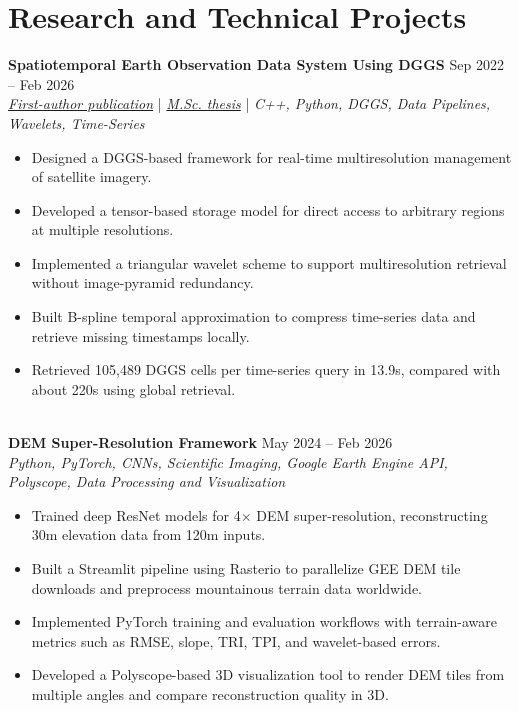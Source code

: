 \documentclass[a4paper,10pt]{article}
\begin{document}

\section*{Research and Technical Projects}

\noindent
\textbf{Spatiotemporal Earth Observation Data System Using DGGS} \hfill Sep 2022 -- Feb 2026 \\
\textit{\href{https://doi.org/10.3390/rs17040570}{First-author publication}} | \textit{\href{https://ucalgary.scholaris.ca/items/114b394b-e516-4732-bd3a-45dd6160d480}{M.Sc. thesis}} | \textit{C++, Python, DGGS, Data Pipelines, Wavelets, Time-Series}
\begin{itemize}[leftmargin=0.25in]
    \item Designed a DGGS-based framework for real-time multiresolution management of satellite imagery.
    \item Developed a tensor-based storage model for direct access to arbitrary regions at multiple resolutions.
    \item Implemented a triangular wavelet scheme to support multiresolution retrieval without image-pyramid redundancy.
    \item Built B-spline temporal approximation to compress time-series data and retrieve missing timestamps locally.
    \item Retrieved 105,489 DGGS cells per time-series query in 13.9s, compared with about 220s using global retrieval.
\end{itemize}

\noindent \\
\textbf{DEM Super-Resolution Framework} \hfill May 2024 -- Feb 2026 \\
\textit{Python, PyTorch, CNNs, Scientific Imaging, Google Earth Engine API, Polyscope, Data Processing and Visualization}
\begin{itemize}[leftmargin=0.25in]
    \item Trained deep ResNet models for 4$\times$ DEM super-resolution, reconstructing 30m elevation data from 120m inputs.
    \item Built a Streamlit pipeline using Rasterio to parallelize GEE DEM tile downloads and preprocess mountainous terrain data worldwide.
    \item Implemented PyTorch training and evaluation workflows with terrain-aware metrics such as RMSE, slope, TRI, TPI, and wavelet-based errors.
    \item Developed a Polyscope-based 3D visualization tool to render DEM tiles from multiple angles and compare reconstruction quality in 3D.
\end{itemize}
\end{document}
